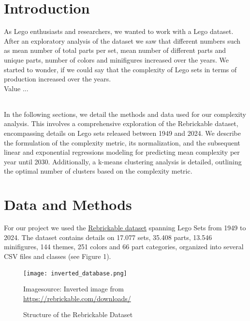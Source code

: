 \documentclass{article}
\theoremstyle{plain}
\theoremstyle{definition}
\theoremstyle{remark}
\newcommand*{\quelle}{
  \footnotesize Imagesource: Inverted image from\\
}
\begin{document}
\section{Introduction}\label{sec:intro}
As Lego enthusiasts and researchers, we wanted to work with a Lego dataset. After an exploratory analysis of the dataset we saw that different numbers such as mean number of total parts per set, mean number of different parts and unique parts, number of colors and minifigures increased over the years. We started to wonder, if we could say that the complexity of Lego sets in terms of production increased over the years. \\

Value ...

\\

In the following sections, we detail the methods and data used for our complexity analysis. This involves a comprehensive exploration of the Rebrickable dataset, encompassing details on Lego sets released between 1949 and 2024. We describe the formulation of the complexity metric, its normalization, and the subsequent linear and exponential regressions modeling for predicting mean complexity per year until 2030. Additionally, a k-means clustering analysis is detailed, outlining the optimal number of clusters based on the complexity metric.


\section{Data and Methods}\label{sec:methods}

For our project we used the \href{https://rebrickable.com/downloads/}{Rebrickable dataset} spanning Lego Sets from 1949 to 2024. The dataset contains details on 17.077 sets, 35.408 parts, 13.546 minifigures, 144 themes, 251 colors and 66 part categories, organized into several CSV files and classes (see Figure 1).

\begin{figure}[ht]
 \vskip 0.2in
 \begin{center}
 \centerline{\texttt{[image: inverted\_database.png]}}
 \quelle\url{https://rebrickable.com/downloads/}
\caption{Structure of the Rebrickable Dataset}
\label{icml-historical}
 \end{center}
 \vskip 0.1in
\end{figure}
\end{document}
